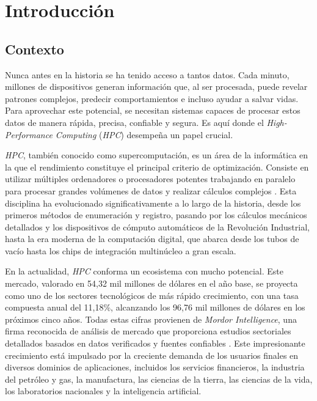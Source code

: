 \chapter{Introducción}

\section{Contexto}
Nunca antes en la historia se ha tenido acceso a tantos datos. Cada minuto, millones de dispositivos generan información que, al ser procesada, puede revelar patrones complejos, predecir comportamientos e incluso ayudar a salvar vidas. Para aprovechar este potencial, se necesitan sistemas capaces de procesar estos datos de manera rápida, precisa, confiable y segura. Es aquí donde el \textit{High-Performance Computing} (\textit{HPC}) desempeña un papel crucial.

\textit{HPC}, también conocido como supercomputación, es un área de la informática en la que el rendimiento constituye el principal criterio de optimización. Consiste en utilizar múltiples ordenadores o procesadores potentes trabajando en paralelo para procesar grandes volúmenes de datos y realizar cálculos complejos \cite{ref1}. Esta disciplina ha evolucionado significativamente a lo largo de la historia, desde los primeros métodos de enumeración y registro, pasando por los cálculos mecánicos detallados y los dispositivos de cómputo automáticos de la Revolución Industrial, hasta la era moderna de la computación digital, que abarca desde los tubos de vacío hasta los chips de integración multinúcleo a gran escala.

En la actualidad, \textit{HPC} conforma un ecosistema con mucho potencial. Este mercado, valorado en 54,32 mil millones de dólares en el año base, se proyecta como uno de los sectores tecnológicos de más rápido crecimiento, con una tasa compuesta anual del 11,18\%, alcanzando los 96,76 mil millones de dólares en los próximos cinco años. Todas estas cifras provienen de \textit{Mordor Intelligence}, una firma reconocida de análisis de mercado que proporciona estudios sectoriales detallados basados en datos verificados y fuentes confiables \cite{ref2}. Este impresionante crecimiento está impulsado por la creciente demanda de los usuarios finales en diversos dominios de aplicaciones, incluidos los servicios financieros, la industria del petróleo y gas, la manufactura, las ciencias de la tierra, las ciencias de la vida, los laboratorios nacionales y la inteligencia artificial.

